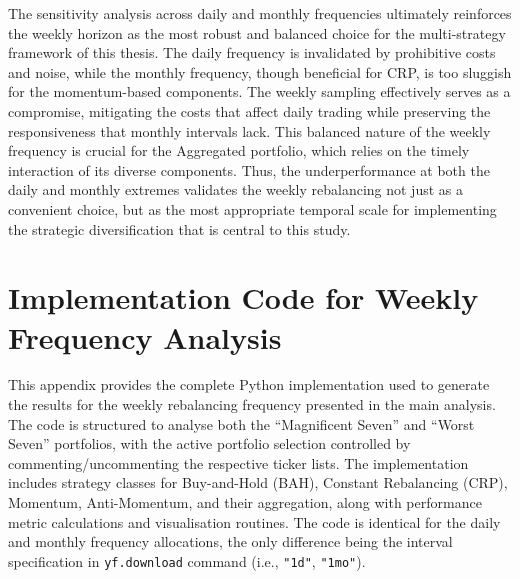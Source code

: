 \documentclass[12pt,a4paper]{report}
\begin{document}
The sensitivity analysis across daily and monthly frequencies ultimately reinforces the weekly horizon as the most robust and balanced choice for the multi-strategy framework of this thesis. The daily frequency is invalidated by prohibitive costs and noise, while the monthly frequency, though beneficial for CRP, is too sluggish for the momentum-based components. The weekly sampling effectively serves as a compromise, mitigating the costs that affect daily trading while preserving the responsiveness that monthly intervals lack. This balanced nature of the weekly frequency is crucial for the Aggregated portfolio, which relies on the timely interaction of its diverse components. Thus, the underperformance at both the daily and monthly extremes validates the weekly rebalancing not just as a convenient choice, but as the most appropriate temporal scale for implementing the strategic diversification that is central to this study.

\chapter{Implementation Code for Weekly Frequency Analysis}
\label{app:b}

This appendix provides the complete Python implementation used to generate the results for the weekly rebalancing frequency presented in the main analysis. The code is structured to analyse both the ``Magnificent Seven'' and ``Worst Seven'' portfolios, with the active portfolio selection controlled by commenting/uncommenting the respective ticker lists. The implementation includes strategy classes for Buy-and-Hold (BAH), Constant Rebalancing (CRP), Momentum, Anti-Momentum, and their aggregation, along with performance metric calculations and visualisation routines. The code is identical for the daily and monthly frequency allocations, the only difference being the interval specification in \texttt{yf.download} command (i.e., \texttt{"1d"}, \texttt{"1mo"}).
\end{document}
